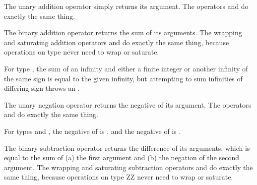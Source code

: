 The unary addition operator \EXP{+} simply returns its argument.
The operators \EXP{\boxplus} and \EXP{\dotplus} do exactly the same thing.


The binary addition operator \EXP{+} returns the sum of its arguments.
The wrapping and saturating addition operators \EXP{\boxplus} and \EXP{\dotplus} do exactly the same thing,
because operations on type  never need to wrap or saturate.

For type , the sum of an infinity
and either a finite integer or another infinity of the same sign is equal to the given infinity,
but attempting to sum infinities of differing sign throws an .



The unary negation operator \EXP{-} returns the negative of its argument.
The operators \EXP{\boxminus} and \EXP{\dotminus} do exactly the same thing.

For types  and , the negative of
\EXP{+\infty} is \EXP{-\infty}, and the negative of \EXP{-\infty} is \EXP{+\infty}.



The binary subtraction operator \EXP{-} returns the difference of its arguments,
which is equal to the sum of (a) the first argument and (b) the negation of the second argument.
The wrapping and saturating subtraction operators \EXP{\boxminus} and \EXP{\dotminus} do exactly the same thing,
because operations on type ZZ never need to wrap or saturate.


